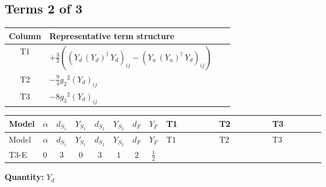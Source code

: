 \documentclass[8pt]{article}
\begin{document}
\begin{landscape}
\subsection*{Terms 2 of 3}
\begin{center}
\begin{tabular}{@{}c >{\raggedright\arraybackslash}p{0.82\linewidth}@{}}
\toprule
Column & Representative term structure \\
\midrule
T1 & \(\displaystyle +\frac{3}{2} (\left({Y_d}\,\left({Y_d}\right)^{\dagger}\,{Y_d}\right)_{ij}-\left({Y_u}\,\left({Y_u}\right)^{\dagger}\,{Y_d}\right)_{ij})\) \\
\midrule
T2 & \(\displaystyle -\frac{9}{4} {g_2}^2 \left({Y_d}\right)_{ij}\) \\
\midrule
T3 & \(\displaystyle -8 {g_3}^2 \left({Y_d}\right)_{ij}\) \\
\midrule
\bottomrule
\end{tabular}
\end{center}
\smallskip
\tiny
\begin{longtable}{@{}llcccccc >{\raggedright\arraybackslash}p{0.21\linewidth} >{\raggedright\arraybackslash}p{0.21\linewidth} >{\raggedright\arraybackslash}p{0.21\linewidth}@{}}
\toprule
Model & $\alpha$ & $d_{S_1}$ & $Y_{S_1}$ & $d_{S_2}$ & $Y_{S_2}$ & $d_F$ & $Y_F$ & T1 & T2 & T3 \\
\midrule
\endfirsthead
\toprule
Model & $\alpha$ & $d_{S_1}$ & $Y_{S_1}$ & $d_{S_2}$ & $Y_{S_2}$ & $d_F$ & $Y_F$ & T1 & T2 & T3 \\
\midrule
\endhead
T3-E & $0$ & $3$ & $0$ & $3$ & $1$ & $2$ & $\frac{1}{2}$ & \scriptsize\adjustbox{max width=\linewidth}{$\begin{gathered} +\frac{3}{2} (\left({Y_d}\,\left({Y_d}\right)^{\dagger}\,{Y_d}\right)_{ij}-\left({Y_u}\,\left({Y_u}\right)^{\dagger}\,{Y_d}\right)_{ij})\end{gathered}$} & \scriptsize\adjustbox{max width=\linewidth}{$\begin{gathered} -\frac{9}{4} {g_2}^2 \left({Y_d}\right)_{ij}\end{gathered}$} & \scriptsize\adjustbox{max width=\linewidth}{$\begin{gathered} -8 {g_3}^2 \left({Y_d}\right)_{ij}\end{gathered}$} \\
\midrule
\bottomrule
\end{longtable}
\clearpage
\noindent\textbf{Quantity: }$Y_d$\par\smallskip

\end{landscape}
\end{document}
